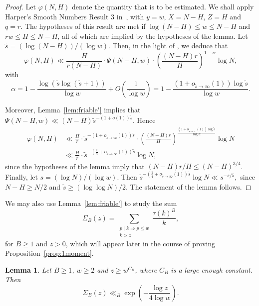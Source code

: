\documentclass[11pt,letterpaper]{amsart}
\renewcommand{\leq}{\leqslant}
\renewcommand{\geq}{\geqslant}
\newtheorem{lemma}[theorem]{Lemma}
\theoremstyle{definition}
\numberwithin{equation}{section}
\newcommand{\0}{\mathbf{0}}
\begin{document}
\begin{proof}
Let $\varphi(N,H)$ denote the quantity that is to be estimated.
We shall apply Harper's Smooth Numbers Result 3 in~\cite{harper}, with $y=w$, $X=N-H$, $Z=H$ and $q=r$.
The hypotheses of this result are met if 
 $\log (N-H)\leq w\leq N-H$ and 
$rw\leq H\leq N-H$, all of which  are implied by the hypotheses of the lemma. 
Let $\tilde s=(\log (N-H))/(\log w)$. 
Then, in the light of 
\cite[Eq.~(2.1)]{harper},  we deduce that 
$$
\varphi(N,H) \ll \frac{H}{r(N-H)}\cdot \Psi(N-H,w)\cdot \left(\frac{(N-H)r}{H}\right)^{1-\alpha}\log N,
$$
with 
$$
\alpha=
1-\frac{\log(\tilde s\log(\tilde s+1))}{\log w}+O\left(\frac{1}{\log w}\right)=
1-\frac{(1+o_{\tilde s \to \infty}(1))\log \tilde s}{\log w}.
$$

Moreover, Lemma~\ref{lem:friable'} implies that 
$\Psi(N-H,w)\ll (N-H){\tilde s}^{-(1+o(1))\tilde s}.$ Hence
\begin{align*}
\varphi(N,H) 
&\ll \frac{H}{r}\cdot {\tilde s}^{-(1+o_{\tilde s\to \infty}(1))\tilde s} \cdot \left(\frac{(N-H)r}{H}\right)^{\frac{(1+o_{\tilde s\to \infty}(1))\log \tilde s}{\log w}}\log N\\
&\ll \frac{H}{r}\cdot {\tilde s}^{-(\frac{1}{4}+o_{\tilde s\to \infty}(1))\tilde s} \log N,
\end{align*}
since the hypotheses of the lemma imply that
$(N-H)r/H\leq (N-H)^{3/4}$. 
Finally, let 
$s=(\log N)/(\log w)$.
Then 
$
{\tilde s}^{-(\frac{1}{4}+o_{\tilde s\to \infty}(1))\tilde s} \log N\ll 
{s}^{-s/5},
$
 since $N-H\geq N/2$ and $\tilde s\geq (\log \log N)/2$.  
The statement of the lemma follows.
\end{proof}

We may also  use Lemma~\ref{lem:friable'} to study the sum
\begin{equation}\label{eq:definition-sig0}
\Sigma_B(z)=\sum_{\substack{p\mid k \Rightarrow p\leq w\\ k>z}} \frac{\tau(k)^{B}}{k},
\end{equation}
for $B\geq 1$ and $z>0$, which will appear later in the course of proving Proposition~\ref{prop:1moment}.

\begin{lemma}\label{lem:gouda}
Let $B\geq 1$, $w\geq 2$ and $z\geq w^{C_B}$, where $C_B$ is a large enough constant. Then 
$$
\Sigma_{B}(z)\ll_B
\exp\left(-\frac{\log z}{4\log w} \right).
$$
\end{lemma}
\end{document}
